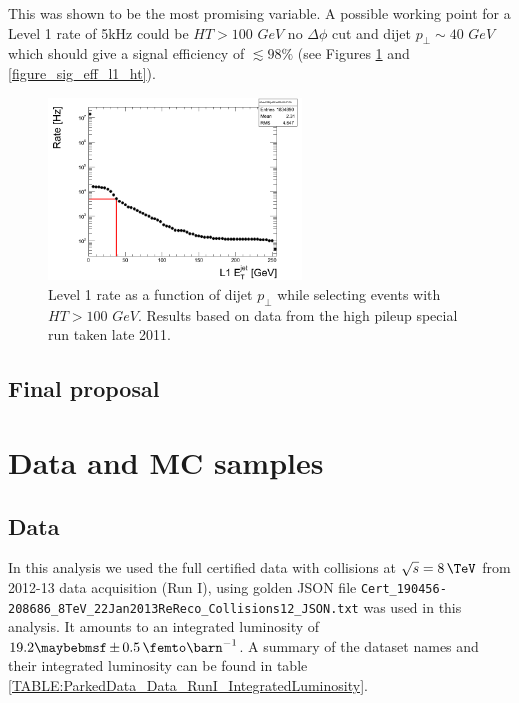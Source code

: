 This was shown to be the most promising variable. A possible working point for a Level 1 rate of 5kHz could be $HT>100$ 
$GeV$ no $\Delta\phi$ cut and dijet $p_\bot \sim 40$ $GeV$ which should give a signal efficiency of $\lesssim98\%$
(see Figures \ref{figure_PU28_5e33_RateFBDijetDEtaDPhi00HT100} and \ref{figure_sig_eff_l1_ht}).

\begin{figure}[ht]
\centering
\includegraphics[width=0.60\textwidth]{Chapter06/ParkedDataTriggerDevelopment/Images/PU28_5e33_RateFBDijetDEtaDPhi00HT100.png}
\caption{Level 1 rate as a function of dijet $p_\bot$ while selecting events with $HT>100$ $GeV$. Results based on
data from the high pileup special run taken late 2011.}
\label{figure_PU28_5e33_RateFBDijetDEtaDPhi00HT100}
\end{figure}

\subsection{Final proposal}



\section{Data and MC samples}

\subsection{Data}

In this analysis we used the full certified data with collisions at $\sqrt{s}=8\,\TeV$ from 2012-13 data acquisition (Run I), using golden JSON file \verb|Cert_190456-208686_8TeV_22Jan2013ReReco_Collisions12_JSON.txt| was used in this analysis. It amounts to an integrated luminosity of $19.2 \pm 0.5 \,\femto\barn^{-1}$. A summary of the dataset names and their integrated luminosity can be found in table \ref{TABLE:ParkedData_Data_RunI_IntegratedLuminosity}.

